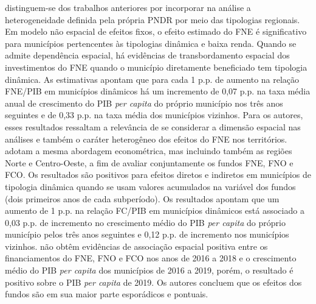  distinguem-se dos trabalhos anteriores por incorporar na análise a heterogeneidade definida pela própria PNDR por meio das tipologias regionais. Em modelo não espacial de efeitos fixos, o efeito estimado do FNE é significativo para municípios pertencentes às tipologias dinâmica e baixa renda. Quando se admite dependência espacial, há evidências de transbordamento espacial dos investimentos do FNE quando o município diretamente beneficiado tem tipologia dinâmica. As estimativas apontam que para cada 1 p.p. de aumento na relação FNE/PIB em municípios dinâmicos há um incremento de 0,07 p.p. na taxa média anual de crescimento do PIB \textit{per capita} do próprio município nos três anos seguintes e de 0,33 p.p. na taxa média dos municípios vizinhos. Para os autores, esses resultados ressaltam a relevância de se considerar a dimensão espacial nas análises e também o caráter heterogêneo dos efeitos do FNE nos territórios.  adotam a mesma abordagem econométrica, mas incluindo também as regiões Norte e Centro-Oeste, a fim de avaliar conjuntamente os fundos FNE, FNO e FCO. Os resultados são positivos para efeitos diretos e indiretos em municípios de tipologia dinâmica quando se usam valores acumulados na variável dos fundos (dois primeiros anos de cada subperíodo). Os resultados apontam que um aumento de 1 p.p. na relação FC/PIB em municípios dinâmicos está associado a 0,03 p.p. de incremento no crescimento médio do PIB \textit{per capita} do próprio município pelos três anos seguintes e 0,12 p.p. de incremento nos municípios vizinhos.  não obtêm evidências de associação espacial positiva entre os financiamentos do FNE, FNO e FCO nos anos de 2016 a 2018 e o crescimento médio do PIB \textit{per capita} dos municípios de 2016 a 2019, porém, o resultado é positivo sobre o PIB \textit{per capita} de 2019. Os autores concluem que os efeitos dos fundos são em sua maior parte esporádicos e pontuais.

